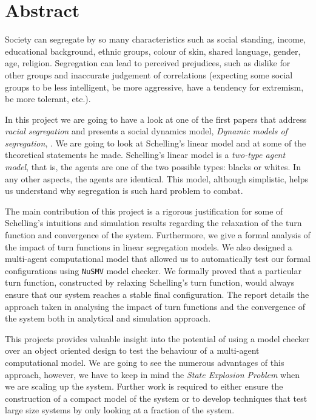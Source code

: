 \documentclass[twoside,openright]{article}
\let\oldsection\section%
\renewcommand{\section}{\cleardoublepage\oldsection}%
\begin{document}
\newpage
\section*{Abstract}
Society can segregate by so many characteristics such as social standing, income, educational background, ethnic groups, colour of skin, shared language, gender, age, religion. Segregation  can lead to perceived prejudices, such as dislike for other groups and inaccurate judgement of correlations (expecting some social groups to be less intelligent, be more aggressive, have a tendency for extremism, be more tolerant, etc.). 

In this project we are going to have a look at one of the first papers that address \textit{racial segregation} and presents a social dynamics model, \textit{Dynamic models of segregation}, \cite{schelling}. We are going to look at Schelling's linear model and at some of the theoretical statements he made. Schelling's linear model is a \textit{two-type agent model}, that is, the agents are one of the two possible types: blacks or whites. In any other aspects, the agents are identical. This model, although simplistic, helps us understand why segregation is such hard problem to combat.

The main contribution of this project is a rigorous justification for some of Schelling's intuitions and simulation results regarding the relaxation of the turn function and convergence of the system. Furthermore, we give a formal analysis of the impact of turn functions in linear segregation models. We also designed a multi-agent computational model that allowed us to automatically test our formal configurations using \verb|NuSMV| model checker. We formally proved that a particular turn function, constructed by relaxing Schelling's turn function, would always ensure that our system reaches a stable final configuration. The report details the approach taken in analysing the impact of turn functions and the convergence of the system both in analytical and simulation approach.

This projects provides valuable insight into the potential of using a model checker over an object oriented design to test the behaviour of a multi-agent computational model. We are going to see the numerous advantages of this approach, however, we have to keep in mind the \textit{State Explosion Problem} when we are scaling up the system. Further work is required to either ensure the construction of a compact model of the system or to develop techniques that test large size systems by only looking at a fraction of the system.
\end{document}
